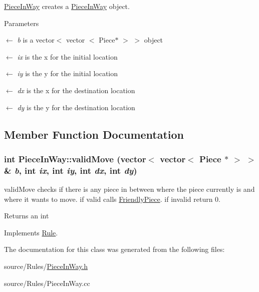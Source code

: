 \hyperlink{classPieceInWay}{PieceInWay} creates a \hyperlink{classPieceInWay}{PieceInWay} object. 
\begin{DoxyParams}{Parameters}
\item[\mbox{$\leftarrow$} {\em b}]is a vector$<$ vector $<$ Piece$\ast$ $>$ $>$ object \item[\mbox{$\leftarrow$} {\em ix}]is the x for the initial location \item[\mbox{$\leftarrow$} {\em iy}]is the y for the initial location \item[\mbox{$\leftarrow$} {\em dx}]is the x for the destination location \item[\mbox{$\leftarrow$} {\em dy}]is the y for the destination location \end{DoxyParams}


\subsection{Member Function Documentation}
\hypertarget{classPieceInWay_a9b34a28e7b7b7ff310f5998ff5f49fb6}{
\subsubsection[{validMove}]{\setlength{\rightskip}{0pt plus 5cm}int PieceInWay::validMove (vector$<$ vector$<$ {\bf Piece} $\ast$ $>$ $>$ \& {\em b}, \/  int {\em ix}, \/  int {\em iy}, \/  int {\em dx}, \/  int {\em dy})}}
\label{classPieceInWay_a9b34a28e7b7b7ff310f5998ff5f49fb6}


validMove checks if there is any piece in between where the piece currently is and where it wants to move. if valid calls \hyperlink{classFriendlyPiece}{FriendlyPiece}. if invalid return 0. \begin{DoxyReturn}{Returns}
an int 
\end{DoxyReturn}


Implements \hyperlink{classRule}{Rule}.

The documentation for this class was generated from the following files:\begin{DoxyCompactItemize}
\item 
source/Rules/\hyperlink{PieceInWay_8h}{PieceInWay.h}\item 
source/Rules/PieceInWay.cc\end{DoxyCompactItemize}

